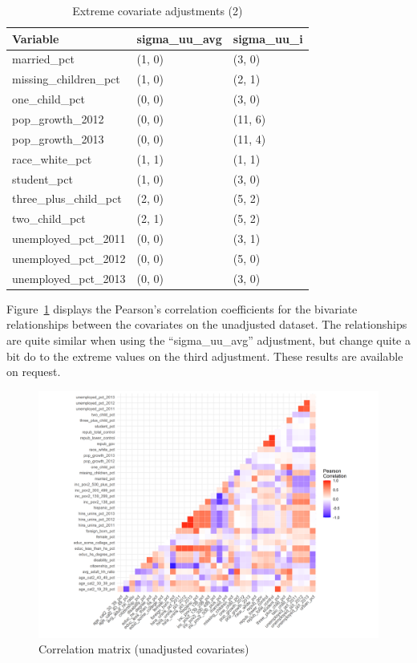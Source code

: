 \documentclass[12pt]{article}
\begin{document}
\begin{table}[ht]
\centering
\begin{tabular}{lll}
  \toprule
Variable & sigma\_uu\_avg & sigma\_uu\_i \\ 
  \midrule
  married\_pct & (1, 0) & (3, 0) \\ 
  missing\_children\_pct & (1, 0) & (2, 1) \\ 
  one\_child\_pct & (0, 0) & (3, 0) \\ 
  pop\_growth\_2012 & (0, 0) & (11, 6) \\ 
  pop\_growth\_2013 & (0, 0) & (11, 4) \\ 
  race\_white\_pct & (1, 1) & (1, 1) \\ 
  student\_pct & (1, 0) & (3, 0) \\ 
  three\_plus\_child\_pct & (2, 0) & (5, 2) \\ 
  two\_child\_pct & (2, 1) & (5, 2) \\ 
  unemployed\_pct\_2011 & (0, 0) & (3, 1) \\ 
  unemployed\_pct\_2012 & (0, 0) & (5, 0) \\ 
  unemployed\_pct\_2013 & (0, 0) & (3, 0) \\ 
   \bottomrule
\end{tabular}
    \caption{Extreme covariate adjustments (2)}
    \label{tab:extreme2}
\end{table}

Figure~\ref{fig:corrmatrix} displays the Pearson's correlation coefficients for the bivariate relationships between the covariates on the unadjusted dataset. The relationships are quite similar when using the ``sigma\_uu\_avg'' adjustment, but change quite a bit do to the extreme values on the third adjustment. These results are available on request.

\begin{figure}[]
\begin{center}
    \includegraphics[scale=0.6]{01_Plots/correlation-plot-c1-sigma-zero.png}
    \caption{Correlation matrix (unadjusted covariates)}
    \label{fig:corrmatrix}
\end{center}
\end{figure}
\end{document}
